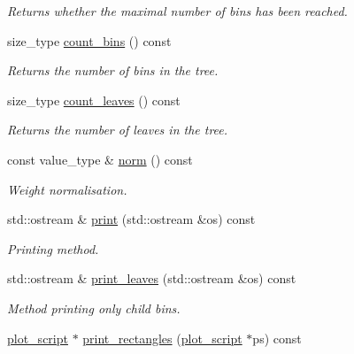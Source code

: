 \begin{DoxyCompactItemize}
\begin{DoxyCompactList}\small\item\em Returns whether the maximal number of bins has been reached. \end{DoxyCompactList}\item 
\hypertarget{a00394_a70542bcc006eac32830247ba96537d53}{}size\+\_\+type \hyperlink{a00394_a70542bcc006eac32830247ba96537d53}{count\+\_\+bins} () const \label{a00394_a70542bcc006eac32830247ba96537d53}

\begin{DoxyCompactList}\small\item\em Returns the number of bins in the tree. \end{DoxyCompactList}\item 
\hypertarget{a00394_a322307f8af44150034bf2fa3ee63780a}{}size\+\_\+type \hyperlink{a00394_a322307f8af44150034bf2fa3ee63780a}{count\+\_\+leaves} () const \label{a00394_a322307f8af44150034bf2fa3ee63780a}

\begin{DoxyCompactList}\small\item\em Returns the number of leaves in the tree. \end{DoxyCompactList}\item 
\hypertarget{a00394_ae3ae2f070e1caa123773bb86dde4eeca}{}const value\+\_\+type \& \hyperlink{a00394_ae3ae2f070e1caa123773bb86dde4eeca}{norm} () const \label{a00394_ae3ae2f070e1caa123773bb86dde4eeca}

\begin{DoxyCompactList}\small\item\em Weight normalisation. \end{DoxyCompactList}\item 
\hypertarget{a00394_a85677d8ad6ee8acd768a3855c29d1fd7}{}std\+::ostream \& \hyperlink{a00394_a85677d8ad6ee8acd768a3855c29d1fd7}{print} (std\+::ostream \&os) const \label{a00394_a85677d8ad6ee8acd768a3855c29d1fd7}

\begin{DoxyCompactList}\small\item\em Printing method. \end{DoxyCompactList}\item 
\hypertarget{a00394_ad91a45d101b082fd8680e81701fe765a}{}std\+::ostream \& \hyperlink{a00394_ad91a45d101b082fd8680e81701fe765a}{print\+\_\+leaves} (std\+::ostream \&os) const \label{a00394_ad91a45d101b082fd8680e81701fe765a}

\begin{DoxyCompactList}\small\item\em Method printing only child bins. \end{DoxyCompactList}\item 
\hypertarget{a00394_acc20c7121fa2831cd931a3a38be58c09}{}\hyperlink{a00431}{plot\+\_\+script} $\ast$ \hyperlink{a00394_acc20c7121fa2831cd931a3a38be58c09}{print\+\_\+rectangles} (\hyperlink{a00431}{plot\+\_\+script} $\ast$ps) const \label{a00394_acc20c7121fa2831cd931a3a38be58c09}


\end{DoxyCompactItemize}
